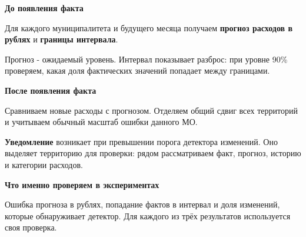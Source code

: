 \documentclass[12pt,a4paper,landscape]{article}
\newcommand{\Aside}[1]{\par{\fontsize{15}{19}\selectfont\bfseries\color{Green}#1\par}\vspace{2mm}}
\begin{document}
\begin{minipage}[t]{.47\linewidth}\vspace{0pt}\RaggedRight
\Aside{До появления факта}
Для каждого муниципалитета и будущего месяца получаем \textbf{прогноз расходов в рублях} и \textbf{границы интервала}.
\par\vspace{6mm}
Прогноз - ожидаемый уровень. Интервал показывает разброс: при уровне 90\% проверяем, какая доля фактических значений попадает между границами.
\end{minipage}\hfill
\begin{minipage}[t]{.47\linewidth}\vspace{0pt}\RaggedRight
\Aside{После появления факта}
Сравниваем новые расходы с прогнозом. Отделяем общий сдвиг всех территорий и учитываем обычный масштаб ошибки данного МО.
\par\vspace{6mm}
\textbf{Уведомление} возникает при превышении порога детектора изменений. Оно выделяет территорию для проверки: рядом рассматриваем факт, прогноз, историю и категории расходов.
\end{minipage}
\par\vspace{9mm}\Aside{Что именно проверяем в экспериментах}
Ошибка прогноза в рублях, попадание фактов в интервал и доля изменений, которые обнаруживает детектор. Для каждого из трёх результатов используется своя проверка.
\end{document}
